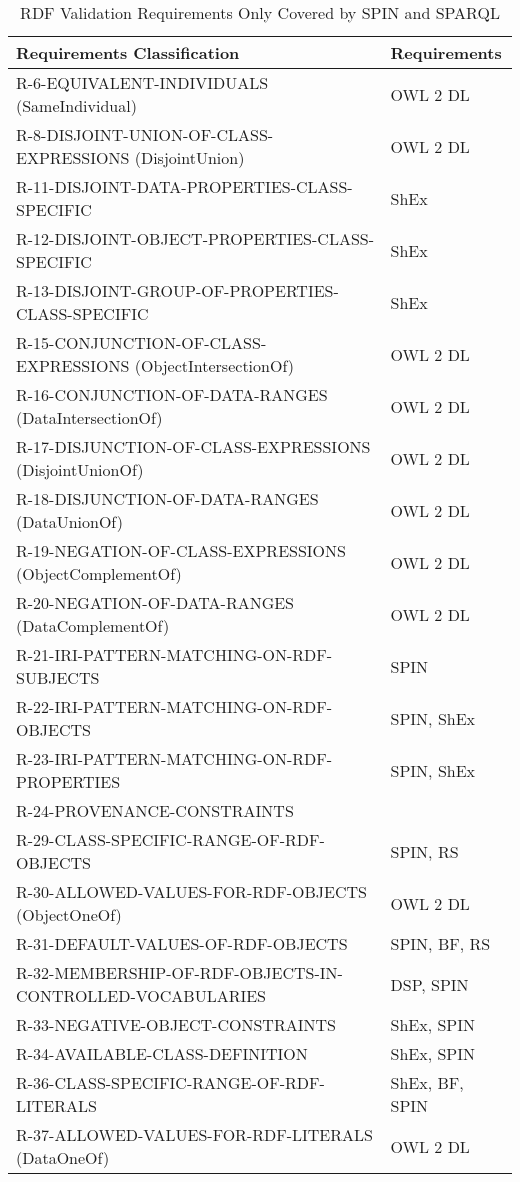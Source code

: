 \documentclass{llncs}
\newcommand{\hr}{\hline\noalign{\smallskip}} %
\begin{document}
\begin{table}
\caption{RDF Validation Requirements Only Covered by SPIN and SPARQL}
\label{tab:RequirementsCoveredSPIN}
\centering
\begin{tabular}{ll}
\hr
Requirements Classification & Requirements \\
\hr
R-6-EQUIVALENT-INDIVIDUALS (SameIndividual) & OWL 2 DL \\
R-8-DISJOINT-UNION-OF-CLASS-EXPRESSIONS (DisjointUnion) & OWL 2 DL \\
R-11-DISJOINT-DATA-PROPERTIES-CLASS-SPECIFIC & ShEx \\
R-12-DISJOINT-OBJECT-PROPERTIES-CLASS-SPECIFIC & ShEx \\
R-13-DISJOINT-GROUP-OF-PROPERTIES-CLASS-SPECIFIC & ShEx \\
R-15-CONJUNCTION-OF-CLASS-EXPRESSIONS (ObjectIntersectionOf) & OWL 2 DL \\
R-16-CONJUNCTION-OF-DATA-RANGES (DataIntersectionOf) & OWL 2 DL \\
R-17-DISJUNCTION-OF-CLASS-EXPRESSIONS (DisjointUnionOf) & OWL 2 DL \\
R-18-DISJUNCTION-OF-DATA-RANGES (DataUnionOf) & OWL 2 DL \\
R-19-NEGATION-OF-CLASS-EXPRESSIONS (ObjectComplementOf) & OWL 2 DL \\
R-20-NEGATION-OF-DATA-RANGES (DataComplementOf) & OWL 2 DL \\
R-21-IRI-PATTERN-MATCHING-ON-RDF-SUBJECTS & SPIN \\
R-22-IRI-PATTERN-MATCHING-ON-RDF-OBJECTS & SPIN, ShEx \\
R-23-IRI-PATTERN-MATCHING-ON-RDF-PROPERTIES & SPIN, ShEx \\
R-24-PROVENANCE-CONSTRAINTS & \\
R-29-CLASS-SPECIFIC-RANGE-OF-RDF-OBJECTS & SPIN, RS \\
R-30-ALLOWED-VALUES-FOR-RDF-OBJECTS (ObjectOneOf) & OWL 2 DL \\
R-31-DEFAULT-VALUES-OF-RDF-OBJECTS & SPIN, BF, RS \\
R-32-MEMBERSHIP-OF-RDF-OBJECTS-IN-CONTROLLED-VOCABULARIES & DSP, SPIN \\
R-33-NEGATIVE-OBJECT-CONSTRAINTS & ShEx, SPIN \\
R-34-AVAILABLE-CLASS-DEFINITION & ShEx, SPIN \\
R-36-CLASS-SPECIFIC-RANGE-OF-RDF-LITERALS & ShEx, BF, SPIN \\
R-37-ALLOWED-VALUES-FOR-RDF-LITERALS (DataOneOf) & OWL 2 DL \\

\end{tabular}
\end{table}
\end{document}
